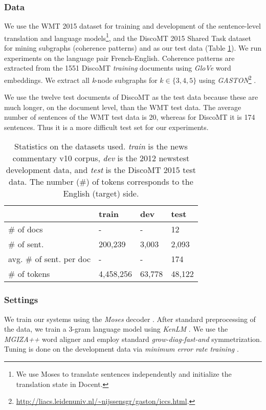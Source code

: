 \subsubsection{Data}
%
We use the WMT 2015 \cite{Bojar2015} dataset for training and development of the sentence-level translation and language models\footnote{We use Moses to translate sentences independently and initialize the translation state in Docent.}, and the DiscoMT 2015 Shared Task \cite{Hardmeier2015} dataset for mining subgraphs (coherence patterns) and as our test data 
(Table \ref{tab:testdatastats}). 
We run experiments on the language pair French-English. 
Coherence patterns are extracted from the 1551 DiscoMT \emph{training} documents using \textit{GloVe} word embeddings. 
We extract all \textit{k}-node subgraphs for $k \in \{3,4,5\}$ using \textit{GASTON}\footnote{\url{http://liacs.leidenuniv.nl/~nijssensgr/gaston/iccs.html}.} \cite{Nijssen2004, Nijssen2005}.

We use the twelve test documents of DiscoMT as the test data because these are much longer, on the document level, than the WMT test data. 
The average number of sentences of the WMT test data is 20, whereas for DiscoMT it is 174 sentences. 
Thus it is a more difficult test set for our experiments.

\begin{table}[!ht]
\centering
\begin{tabular}{ p{2.2cm}|l|l|l }
\hline
& \textbf{train} & \textbf{dev} & \textbf{test}\\
\hline
\# of docs & \-- & \-- & 12\\
\# of sent. & 200,239 & 3,003 & 2,093\\
avg. \# of sent. per doc & \-- & \-- & 174\\
\# of tokens & 4,458,256 & 63,778 & 48,122\\
\hline
\end{tabular}
\caption{Statistics on the datasets used. \textit{train} is the news commentary v10 corpus, \textit{dev} is the 2012 newstest development data, and \textit{test}  is the DiscoMT 2015 test data. The number (\#) of tokens corresponds to the English (target) side.}
\label{tab:testdatastats}
\end{table}


\subsubsection{Settings}

We train our systems using the \textit{Moses} decoder \cite{Koehn2007}. After standard preprocessing of the data, we train a 3-gram language model using \textit{KenLM} \cite{Heafield2011}. We use the \textit{MGIZA++} \cite{Gao2008} word aligner and employ standard \textit{grow-diag-fast-and} symmetrization.
Tuning is done on the development data via \textit{minimum error rate training} \cite{Och2003}.

